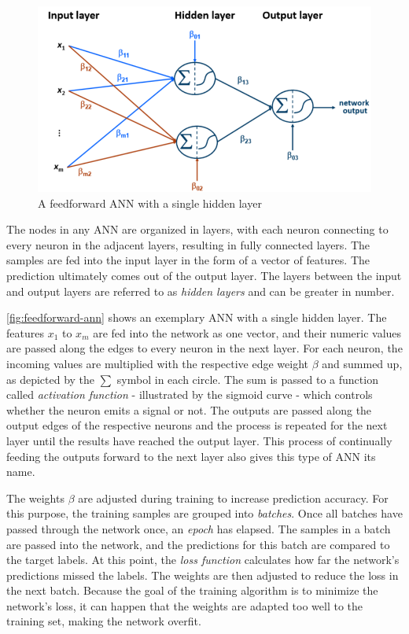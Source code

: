 \begin{figure}[!htb]
    \centering
    \includegraphics[width=.85\textwidth]{gfx/feedforward-neural-network.png}
    \caption{A feedforward ANN with a single hidden layer~\cite{lessmannBADS}}
    \label{fig:feedforward-ann}
\end{figure}

The nodes in any ANN are organized in layers, with each neuron connecting to every neuron in the adjacent layers, resulting in fully connected layers. The samples are fed into the input layer in the form of a vector of features. The prediction ultimately comes out of the output layer. The layers between the input and output layers are referred to as \textit{hidden layers} and  can be greater in number.

\autoref{fig:feedforward-ann} shows an exemplary ANN with a single hidden layer. The features $x_1$ to $x_m$ are fed into the network as one vector, and their numeric values are passed along the edges to every neuron in the next layer. For each neuron, the incoming values are multiplied with the respective edge weight $\beta$ and summed up, as depicted by the $\sum$ symbol in each circle. The sum is passed to a function called \textit{activation function} - illustrated by the sigmoid curve - which controls whether the neuron emits a signal or not. The outputs are passed along the output edges of the respective neurons and the process is repeated for the next layer until the results have reached the output layer. This process of continually feeding the outputs forward to the next layer also gives this type of ANN its name.

The weights $\beta$ are adjusted during training to increase prediction accuracy. For this purpose, the training samples are grouped into \textit{batches}. Once all batches have passed through the network once, an \textit{epoch} has elapsed. The samples in a batch are passed into the network, and the predictions for this batch are compared to the target labels. At this point, the \textit{loss function} calculates how far the network's predictions missed the labels. The weights are then adjusted to reduce the loss in the next batch. Because the goal of the training algorithm is to minimize the network's loss, it can happen that the weights are adapted too well to the training set, making the network overfit.

